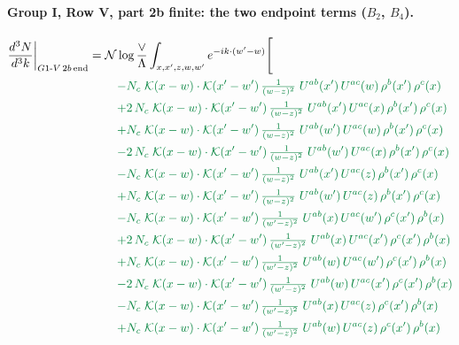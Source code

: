 \documentclass[10pt]{article}
\numberwithin{equation}{section}
\newcommand{\NN}{\mathcal N\log\frac{\vee}{\Lambda}}
\begin{document}
\paragraph{Group I, Row V, part 2b finite: the two endpoint terms ($B_2$, $B_4$).}
\begin{align}
\frac{d^3N}{d^3k}\bigg|_{G1\text{-}V\,2b\,{\rm end}}={}&\NN\int_{x,x',z,w,w'}e^{-ik\cdot(w'-w)}\Bigg[\notag\\
&\quad{\color{JIM}-N_c\;\mathcal{K}(x-w)\cdot\mathcal{K}(x'-w')\,\tfrac{1}{(w-z)^{2}}\;U^{ab}(x')\,U^{ac}(w)\,\rho^{b}(x')\,\rho^{c}(x)}\notag\\
&\quad{\color{JIM}+2\,N_c\;\mathcal{K}(x-w)\cdot\mathcal{K}(x'-w')\,\tfrac{1}{(w-z)^{2}}\;U^{ab}(x')\,U^{ac}(x)\,\rho^{b}(x')\,\rho^{c}(x)}\notag\\
&\quad{\color{JIM}+N_c\;\mathcal{K}(x-w)\cdot\mathcal{K}(x'-w')\,\tfrac{1}{(w-z)^{2}}\;U^{ab}(w')\,U^{ac}(w)\,\rho^{b}(x')\,\rho^{c}(x)}\notag\\
&\quad{\color{JIM}-2\,N_c\;\mathcal{K}(x-w)\cdot\mathcal{K}(x'-w')\,\tfrac{1}{(w-z)^{2}}\;U^{ab}(w')\,U^{ac}(x)\,\rho^{b}(x')\,\rho^{c}(x)}\notag\\
&\quad{\color{JIM}-N_c\;\mathcal{K}(x-w)\cdot\mathcal{K}(x'-w')\,\tfrac{1}{(w-z)^{2}}\;U^{ab}(x')\,U^{ac}(z)\,\rho^{b}(x')\,\rho^{c}(x)}\notag\\
&\quad{\color{JIM}+N_c\;\mathcal{K}(x-w)\cdot\mathcal{K}(x'-w')\,\tfrac{1}{(w-z)^{2}}\;U^{ab}(w')\,U^{ac}(z)\,\rho^{b}(x')\,\rho^{c}(x)}\notag\\
&\quad{\color{JIM}-N_c\;\mathcal{K}(x-w)\cdot\mathcal{K}(x'-w')\,\tfrac{1}{(w'-z)^{2}}\;U^{ab}(x)\,U^{ac}(w')\,\rho^{c}(x')\,\rho^{b}(x)}\notag\\
&\quad{\color{JIM}+2\,N_c\;\mathcal{K}(x-w)\cdot\mathcal{K}(x'-w')\,\tfrac{1}{(w'-z)^{2}}\;U^{ab}(x)\,U^{ac}(x')\,\rho^{c}(x')\,\rho^{b}(x)}\notag\\
&\quad{\color{JIM}+N_c\;\mathcal{K}(x-w)\cdot\mathcal{K}(x'-w')\,\tfrac{1}{(w'-z)^{2}}\;U^{ab}(w)\,U^{ac}(w')\,\rho^{c}(x')\,\rho^{b}(x)}\notag\\
&\quad{\color{JIM}-2\,N_c\;\mathcal{K}(x-w)\cdot\mathcal{K}(x'-w')\,\tfrac{1}{(w'-z)^{2}}\;U^{ab}(w)\,U^{ac}(x')\,\rho^{c}(x')\,\rho^{b}(x)}\notag\\
&\quad{\color{JIM}-N_c\;\mathcal{K}(x-w)\cdot\mathcal{K}(x'-w')\,\tfrac{1}{(w'-z)^{2}}\;U^{ab}(x)\,U^{ac}(z)\,\rho^{c}(x')\,\rho^{b}(x)}\notag\\
&\quad{\color{JIM}+N_c\;\mathcal{K}(x-w)\cdot\mathcal{K}(x'-w')\,\tfrac{1}{(w'-z)^{2}}\;U^{ab}(w)\,U^{ac}(z)\,\rho^{c}(x')\,\rho^{b}(x)}\notag\\

\end{align}
\end{document}
